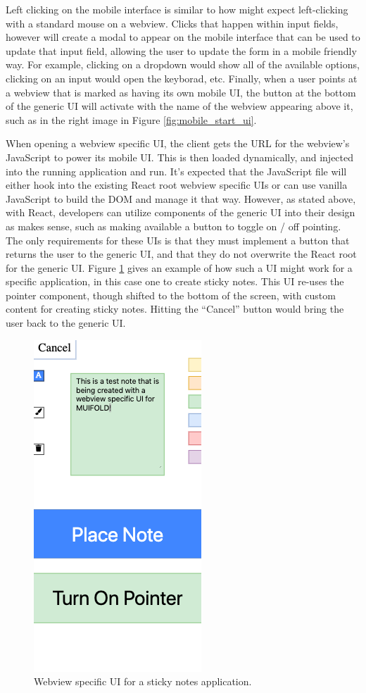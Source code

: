 Left clicking on the mobile interface is similar to how might
expect left-clicking with a standard mouse on a webview. Clicks that
happen within input fields, however will create a modal to appear
on the mobile interface that can be used to update that input
field, allowing the user to update the form in a mobile friendly
way. For example, clicking on a dropdown would show all of
the available options, clicking on an input would open the
keyborad, etc. Finally, when a user points at a webview that
is marked as having its own mobile UI, the button at the bottom
of the generic UI will activate with the name of the webview
appearing above it, such as in the right image in Figure
\ref{fig:mobile_start_ui}.

When opening a webview specific UI, the client gets the
URL for the webview's JavaScript to power its mobile UI. This
is then loaded dynamically, and injected into the running
application and run. It's expected that the JavaScript file will
either hook into the existing React root webview specific UIs or
can use vanilla JavaScript to build the DOM and manage it that way.
However, as stated above, with React, developers can utilize
components of the generic UI into their design as makes sense,
such as making available a button to toggle on / off pointing. The
only requirements for these UIs is that they must implement a button
that returns the user to the generic UI, and that they do not
overwrite the React root for the generic UI. Figure
\ref{fig:application_specific_ui} gives an example of how such
a UI might work for a specific application, in this case one
to create sticky notes. This UI re-uses the pointer component,
though shifted to the bottom of the screen, with custom content
for creating sticky notes. Hitting the ``Cancel'' button would
bring the user back to the generic UI.

\begin{figure}
\centering
  \includegraphics[width=0.40\columnwidth]{figures/application_specific_ui}
  \caption{Webview specific UI for a sticky notes application.}
  \label{fig:application_specific_ui}
\end{figure}
